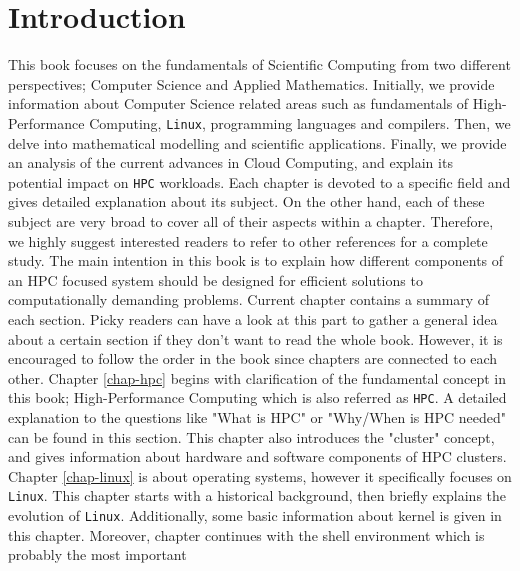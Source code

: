 \chapter{Introduction} \label{chap-introduction}
This book focuses on the fundamentals of Scientific Computing from two different perspectives;
Computer Science and Applied Mathematics. Initially, we provide information about Computer
Science related areas such as fundamentals of High-Performance Computing, \texttt{Linux}, 
programming languages and compilers. Then, we delve into mathematical modelling and scientific 
applications. Finally, we provide an analysis of the current advances in Cloud Computing, and 
explain its potential impact on \texttt{HPC} workloads.
\newline \newline 
Each chapter is devoted to a specific field and gives detailed explanation about its subject.
On the other hand, each of these subject are very broad to cover all of their aspects within a
chapter. Therefore, we highly suggest interested readers to refer to other references for a 
complete study. The main intention in this book is to explain how different components of an HPC 
focused system should be designed for efficient solutions to computationally demanding problems.
\newline \newline 
Current chapter contains a summary of each section. Picky readers can have a look at this part to
gather a general idea about a certain section if they don't want to read the whole book. However,
it is encouraged to follow the order in the book since chapters are connected to each other.
\newline \newline 
Chapter \ref{chap-hpc} begins with clarification of the fundamental concept in this book; 
High-Performance Computing which is also referred as \texttt{HPC}. A detailed explanation to the
questions like "What is HPC" or "Why/When is HPC needed" can be found in this section. This
chapter also introduces the "cluster" concept, and gives information about hardware and software
components of HPC clusters.  
\newline \newline 
Chapter \ref{chap-linux} is about operating systems, however it specifically focuses on 
\texttt{Linux}. This chapter starts with a historical background, then briefly explains the 
evolution of \texttt{Linux}. Additionally, some basic information about kernel is given in this 
chapter. Moreover, chapter continues with the shell environment which is probably the most important 
